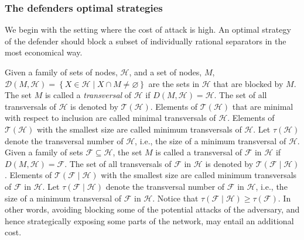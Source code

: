 \documentclass[11pt,fleqn]{article}
\begin{document}
\subsubsection{The defenders optimal strategies}

We begin with the setting where the cost of attack is high. An optimal strategy of the defender should block a subset of individually rational separators in the most economical way.

Given a family of sets of nodes, $\mathcal{H}$, and a set of nodes, $M$, $\mathcal{D}(M, \mathcal{H}) = \left\{ X \in \mathcal{H} \mid X \cap M \neq \varnothing \right\}$ are the sets in $\mathcal{H}$ that are blocked by $M$. The set $M$ is called a \emph{transversal} of $\mathcal{H}$ if $D(M, \mathcal{H}) = \mathcal{H}$. The set of all transversals of $\mathcal{H}$ is denoted by $\mathcal{T}(\mathcal{H})$. Elements of $\mathcal{T}(\mathcal{H})$ that are minimal with respect to inclusion are called minimal transversals of $\mathcal{H}$. Elements of $\mathcal{T}(\mathcal{H})$ with the smallest size are called minimum transversals of $\mathcal{H}$. Let $\tau(\mathcal{H})$ denote the transversal number of $\mathcal{H}$, i.e., the size of a minimum transversal of $\mathcal{H}$. Given a family of sets $\mathcal{F} \subseteq \mathcal{H}$, the set $M$ is called a transversal of $\mathcal{F}$ in $\mathcal{H}$ if $D(M, \mathcal{H}) = \mathcal{F}$. The set of all transversals of $\mathcal{F}$ in $\mathcal{H}$ is denoted by $\mathcal{T}(\mathcal{F} \mid \mathcal{H})$. Elements of $\mathcal{T}(\mathcal{F} \mid \mathcal{H})$ with the smallest size are called minimum transversals of $\mathcal{F}$ in $\mathcal{H}$. Let $\tau(\mathcal{F} \mid \mathcal{H})$ denote the transversal number of $\mathcal{F}$ in $\mathcal{H}$, i.e., the size of a minimum transversal of $\mathcal{F}$ in $\mathcal{H}$. Notice that $\tau(\mathcal{F} \mid \mathcal{H}) \geqslant \tau(\mathcal{F})$. In other words, avoiding blocking some of the potential attacks of the adversary, and hence strategically exposing some parts of the network, may entail an additional cost.
\end{document}
